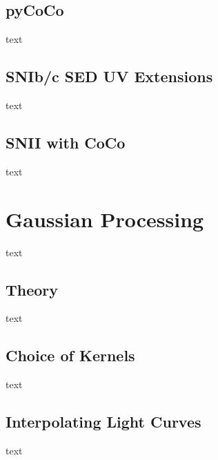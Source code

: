 \subsection{pyCoCo}
text
\subsection{SNIb/c SED UV Extensions}
text
\subsection{SNII with CoCo}
text

\section{Gaussian Processing}
text
\subsection{Theory}
text
\subsection{Choice of Kernels}
text
\subsection{Interpolating Light Curves}
text
